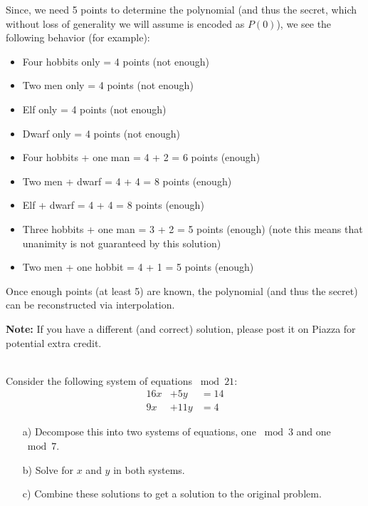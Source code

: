 \documentclass[]{article}
\begin{document}
\begin{qunlist}
{{Since, we need 5 points to determine the polynomial (and thus the secret, which without loss of generality we will assume is encoded as $P(0)$), we see the following behavior (for example):
\begin{itemize}
	\item Four hobbits only = 4 points (not enough)
	\item Two men only = 4 points (not enough)
	\item Elf only = 4 points (not enough)
	\item Dwarf only = 4 points (not enough)
	\item Four hobbits + one man = 4 + 2 = 6 points (enough)
	\item Two men + dwarf = 4 + 4 = 8 points (enough)
	\item Elf + dwarf = 4 + 4 = 8 points (enough)
	\item Three hobbits + one man = 3 + 2 = 5 points (enough) (note this means that unanimity is not guaranteed by this solution)
	\item Two men + one hobbit = 4 + 1 = 5 points (enough)
\end{itemize}

Once enough points (at least 5) are known, the polynomial (and thus the secret) can be reconstructed via interpolation.

\textbf{Note:} If you have a different (and correct) solution, please post it on Piazza for potential extra credit.

}}\fi



\\ %
Consider the following system of equations $\bmod{21}$:
\begin{align*}
16x &+ 5y &= 14 \\
9x &+ 11y &= 4
\end{align*}

\begin{itemize}  
\qpart
\item[a)] Decompose this into two systems of equations, one $\bmod 3$ and one $\bmod 7$.
\qpart
\item[b)] Solve for $x$ and $y$ in both systems.
\qpart
\item[c)] Combine these solutions to get a solution to the original problem.
\end{itemize}



\end{qunlist}
\end{document}
